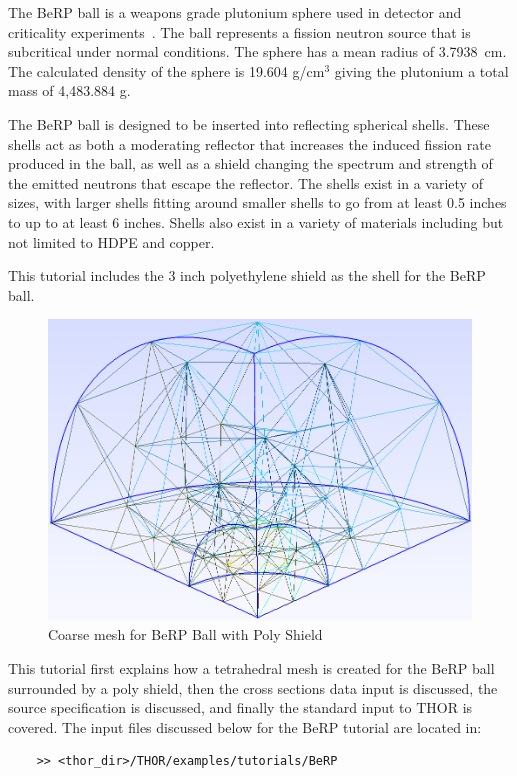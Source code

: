 The BeRP ball is a weapons grade plutonium sphere used in detector and criticality experiments~\cite{BeRP_report}.
The ball represents a fission neutron source that is subcritical under normal conditions.
The sphere has a mean radius of 3.7938~cm.
The calculated density of the sphere is 19.604 g/cm$^3$ giving the plutonium a total mass of 4,483.884 g.

The BeRP ball is designed to be inserted into reflecting spherical shells.
These shells act as both a moderating reflector that increases the induced fission rate produced in the ball, as well as a shield changing the spectrum and strength of the emitted neutrons that escape the reflector.
The shells exist in a variety of sizes, with larger shells fitting around smaller shells to go from at least 0.5 inches to up to at least 6 inches.
Shells also exist in a variety of materials including but not limited to \ac{HDPE} and copper.

This tutorial includes the 3 inch polyethylene shield as the shell for the BeRP ball.

\begin{figure}[th]
  \includegraphics[width=1.0\textwidth]{chapters/tutorials/figures/berp_coarse.png}
  \caption{Coarse mesh for BeRP Ball with Poly Shield}
  \label{fig:berp_coarse}
\end{figure}

This tutorial first explains how a tetrahedral mesh is created for the BeRP ball surrounded by a poly shield, then the cross sections data input is discussed, the source specification is discussed, and finally the standard input to THOR is covered.
The input files discussed below for the BeRP tutorial are located in:
\begin{verbatim}
    >> <thor_dir>/THOR/examples/tutorials/BeRP
\end{verbatim}


